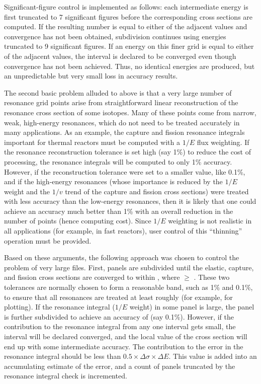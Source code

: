 Significant-figure control is implemented as follows:  each
intermediate energy is first truncated to 7 significant
figures before the corresponding cross sections are computed.
If the resulting number is equal to either of the adjacent
values and convergence has not been obtained, subdivision
continues using energies truncated to 9 significant figures.
If an energy on this finer grid is equal to either of the
adjacent values, the interval is declared to be converged
even though convergence has not been achieved.  Thus, no
identical energies are produced, but an unpredictable but
very small loss in accuracy results.

The second basic problem alluded to above is that a very large
number of resonance grid points arise from straightforward
linear reconstruction of the resonance cross section of some
isotopes.  Many of these points come from narrow, weak,
high-energy resonances, which do not need to be treated
accurately in many applications.  As an example, the capture and
fission resonance integrals important for thermal reactors must
be computed with a $1/E$ flux weighting.  If the resonance
reconstruction tolerance is set high (say 1\%) to reduce the cost
of processing, the resonance integrals will be computed to only
1\% accuracy.  However, if the reconstruction tolerance were set
to a smaller value, like 0.1\%, and if the high-energy resonances
(whose importance is reduced by the $1/E$ weight and the $1/v$
trend of the capture and fission cross sections) were treated
with less accuracy than the low-energy resonances, then it is
likely that one could achieve an accuracy much better than 1\%
with an overall reduction in the number of points (hence computing
cost).  Since $1/E$ weighting is not realistic in all applications
(for example, in fast reactors), user control of this
``thinning'' operation must be provided.

Based on these arguments, the following approach was chosen to
control the problem of very large files.  First, panels are
subdivided until the elastic, capture, and fission cross sections
are converged to within , where 
$\ge$ .  These two tolerances are normally chosen to
form a reasonable band, such as 1\% and 0.1\%, to ensure that
all resonances are treated at least roughly (for example, for
plotting).  If the resonance integral ($1/E$ weight) in some panel
is large, the panel is further subdivided to achieve an accuracy
of  (say 0.1\%).  However, if the contribution to the
resonance integral from any one interval gets small, the interval
will be declared converged, and the local value of the cross
section will end up with some intermediate accuracy.  The
contribution to the error in the resonance integral should be
less than $0.5{\times}\Delta\sigma{\times}\Delta E$.  This value
is added into an accumulating estimate of the error, and a count
of panels truncated by the resonance integral check is
incremented.

